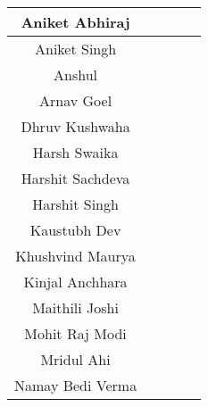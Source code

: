 \begin{center}
\begin{longtable}{|c|c|p{1.2cm}|c|c|}
Aniket Abhiraj    & \cellcolor[HTML]{92D050} & \cellcolor[HTML]{92D050} & \cellcolor[HTML]{F2F2F2} & \cellcolor[HTML]{F2F2F2} \\ \hline
Aniket Singh      & \cellcolor[HTML]{92D050} & \cellcolor[HTML]{00B050} & \cellcolor[HTML]{F2F2F2} & \cellcolor[HTML]{FFC000} \\ \hline
Anshul            & \cellcolor[HTML]{FFFF00} & \cellcolor[HTML]{FFFF00} & \cellcolor[HTML]{F2F2F2} & \cellcolor[HTML]{FFC000} \\ \hline
Arnav Goel        & \cellcolor[HTML]{92D050} & \cellcolor[HTML]{92D050} & \cellcolor[HTML]{F2F2F2} & \cellcolor[HTML]{FFC000} \\ \hline
Dhruv Kushwaha    & \cellcolor[HTML]{92D050} & \cellcolor[HTML]{00B050} & \cellcolor[HTML]{F2F2F2} & \cellcolor[HTML]{F2F2F2} \\ \hline
Harsh Swaika      & \cellcolor[HTML]{92D050} & \cellcolor[HTML]{92D050} & \cellcolor[HTML]{FFC000} & \cellcolor[HTML]{F2F2F2} \\ \hline
Harshit Sachdeva  & \cellcolor[HTML]{92D050} & \cellcolor[HTML]{FFFF00} & \cellcolor[HTML]{F2F2F2} & \cellcolor[HTML]{F2F2F2} \\ \hline
Harshit Singh     & \cellcolor[HTML]{92D050} & \cellcolor[HTML]{00B050} & \cellcolor[HTML]{FFC000} & \cellcolor[HTML]{F2F2F2} \\ \hline
Kaustubh Dev      & \cellcolor[HTML]{FFFF00} & \cellcolor[HTML]{92D050} & \cellcolor[HTML]{FFC000} & \cellcolor[HTML]{F2F2F2} \\ \hline
Khushvind Maurya  & \cellcolor[HTML]{92D050} & \cellcolor[HTML]{92D050} & \cellcolor[HTML]{F2F2F2} & \cellcolor[HTML]{F2F2F2} \\ \hline
Kinjal Anchhara   & \cellcolor[HTML]{92D050} & \cellcolor[HTML]{00B050} & \cellcolor[HTML]{F2F2F2} & \cellcolor[HTML]{F2F2F2} \\ \hline
Maithili Joshi    & \cellcolor[HTML]{92D050} & \cellcolor[HTML]{00B050} & \cellcolor[HTML]{F2F2F2} & \cellcolor[HTML]{F2F2F2} \\ \hline
Mohit Raj Modi    & \cellcolor[HTML]{92D050} & \cellcolor[HTML]{92D050} & \cellcolor[HTML]{F2F2F2} & \cellcolor[HTML]{F2F2F2} \\ \hline
Mridul Ahi        & \cellcolor[HTML]{FFFF00} & \cellcolor[HTML]{92D050} & \cellcolor[HTML]{FFC000} & \cellcolor[HTML]{F2F2F2} \\ \hline
Namay Bedi Verma  & \cellcolor[HTML]{92D050} & \cellcolor[HTML]{92D050} & \cellcolor[HTML]{FFC000} & \cellcolor[HTML]{F2F2F2} \\ \hline

\end{longtable}
\end{center}
